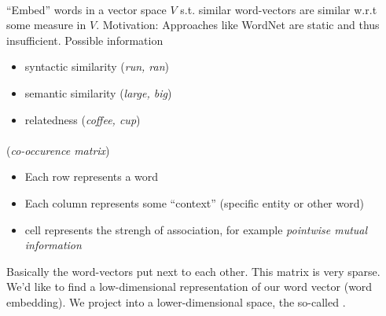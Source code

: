 \documentclass[10pt,twocolumn]{article}
\begin{document}
\paragraph{} ``Embed'' words in a vector space $V$ s.t. similar
word-vectors are similar w.r.t some measure in $V$. Motivation: Approaches like WordNet are static and thus
insufficient. Possible information
\begin{itemize}
\item syntactic similarity (\textit{run, ran})
\item semantic similarity (\textit{large, big})
\item relatedness (\textit{coffee, cup})
\end{itemize}

\paragraph{} (\textit{co-occurence matrix})
\begin{itemize}
\item Each row represents a word
\item Each column represents some ``context'' (specific entity or other word)
\item cell represents the strengh of association, for example \textit{pointwise
    mutual information}
\end{itemize}
Basically the word-vectors put next to each other. This matrix is very sparse.
We'd like to find a low-dimensional representation of our word vector (word
embedding). We project into a lower-dimensional space, the so-called .
\end{document}
